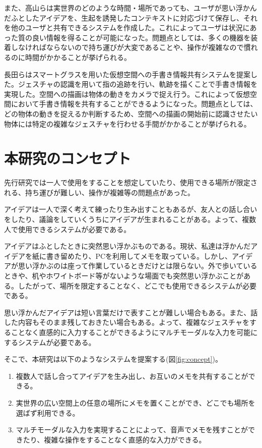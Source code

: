 \documentclass{hissymp}
\begin{document}
また、高山ら\cite{tex3,tex4}は実世界のどのような時間・場所であっても、ユーザが思い浮かんだふとしたアイデアを、生起を誘発したコンテキストに対応づけて保存し、それを他のユーザと共有できるシステムを作成した。これによってユーザは状況にあった質の良い情報を得ることが可能になった。問題点としては、多くの機器を装着しなければならないので持ち運びが大変であることや、操作が複雑なので慣れるのに時間がかかることが挙げられる。

長田ら\cite{tex5}はスマートグラスを用いた仮想空間への手書き情報共有システムを提案した。ジェスチャの認識を用いて指の追跡を行い、軌跡を描くことで手書き情報を実現した。空間への描画は物体の動きをカメラで捉え行う。これによって仮想空間において手書き情報を共有することができるようになった。問題点としては、どの物体の動きを捉えるか判断するため、空間への描画の開始前に認識させたい物体には特定の複雑なジェスチャを行わせる手間がかかることが挙げられる。

\section{本研究のコンセプト}
先行研究では一人で使用をすることを想定していたり、使用できる場所が限定される、持ち運びが難しい、操作が複雑等の問題点があった。

アイデアは一人で深く考えて練ったり生み出すこともあるが、友人との話し合いをしたり、議論をしていくうちにアイデアが生まれることがある。よって、複数人で使用できるシステムが必要である。

アイデアはふとしたときに突然思い浮かぶものである。現状、私達は浮かんだアイデアを紙に書き留めたり、PCを利用してメモを取っている。しかし、アイデアが思い浮かぶのは座って作業しているときだけとは限らない。外で歩いているときや、机やホワイトボード等がないような場面でも突然思い浮かぶことがある。したがって、場所を限定することなく、どこでも使用できるシステムが必要である。

思い浮かんだアイデアは短い言葉だけで表すことが難しい場合もある。また、話した内容もそのまま残しておきたい場合もある。よって、複雑なジェスチャをすることなく直感的に入力することができるようにマルチモーダルな入力を可能にするシステムが必要である。

そこで、本研究は以下のようなシステムを提案する(図\ref{fig:concept})。
\begin{enumerate}[(1)]
 \item 複数人で話し合ってアイデアを生み出し、お互いのメモを共有することができる。
 \item 実世界の広い空間上の任意の場所にメモを置くことができ、どこでも場所を選ばず利用できる。
 \item マルチモーダルな入力を実現することによって、音声でメモを残すことができたり、複雑な操作をすることなく直感的な入力ができる。
\end{enumerate}
\end{document}
